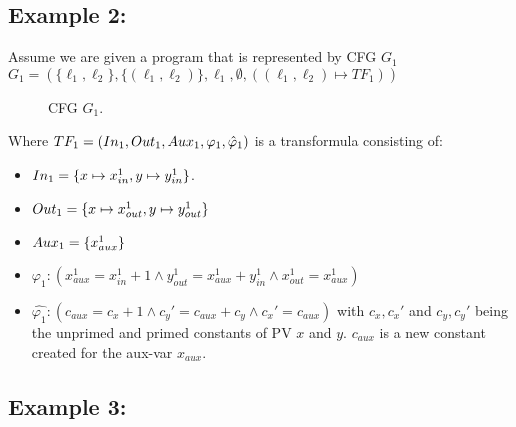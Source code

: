 \documentclass{article}
\newcommand\mycom[1]{}
\newcommand\mycom[1]{#1}
\newcommand{\jw}[1]{\mycom{\todo[color=blue!40,inline]{\small JW: #1}}}
\begin{document}
	\subsection*{Example 2:}
	Assume we are given a program that is represented by CFG $G_1$ \\ $G_1 = (\{ \ell_1, \ell_2 \}, \{ (\ell_1, \ell_2)\}, \ell_1, \emptyset, ((\ell_1, \ell_2) 
	\mapsto TF_1))$
	\begin{figure}[H]
		\centering
		\caption{CFG $G_1$.}
	\end{figure}

	Where $TF_1 = (In_1, Out_1, Aux_1, \varphi_1, \hat{\varphi}_1)$ is a transformula consisting of: 
	\begin{itemize}
		\item $In_1 = \{x \mapsto x_{in}^1, y \mapsto y_{in}^1 \}$.
		\item $Out_1 = \{ x \mapsto x_{out}^1, y \mapsto y_{out}^1 \}$
		\item $Aux_1 = \{x_{aux}^1 \} $
		\item $\varphi_1: (x_{aux}^1 = x_{in}^1 + 1 \land y_{out}^1 = x_{aux}^1 + y_{in}^1 \land x_{out}^1 = x_{aux}^1)$
		\item $\hat{\varphi_1}: (c_{aux} = c_x + 1 \land c_y' = c_{aux} + c_y \land c_x' = c_{aux})$ with $c_x, c_x'$ and $c_y, c_y'$ being the unprimed and primed constants of PV $x$ and $y$. $c_{aux}$ is a new constant created for the aux-var $x_{aux}$.
	\end{itemize}
	\jw{Fuse them together to show the renaming process.}
	
	\subsection*{Example 3:}
	
\end{document}
